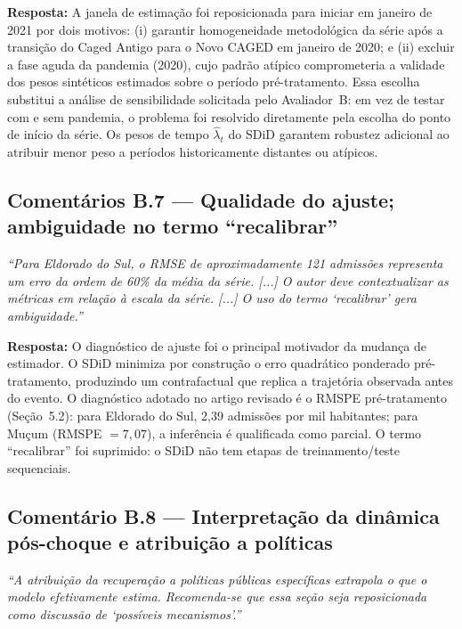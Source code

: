 \documentclass[a4paper,12pt]{article}
\newcommand{\avB}[1]{\textcolor{corB}{\textit{#1}}}
\newcommand{\resposta}[1]{\noindent\textbf{Resposta:} #1}
\begin{document}
\bigskip

\resposta{A janela de estimação foi reposicionada para iniciar em janeiro de 2021 por
dois motivos: (i) garantir homogeneidade metodológica da série após a transição do
Caged Antigo para o Novo CAGED em janeiro de 2020; e (ii) excluir a fase aguda da
pandemia (2020), cujo padrão atípico comprometeria a validade dos pesos sintéticos
estimados sobre o período pré-tratamento. Essa escolha substitui a análise de
sensibilidade solicitada pelo Avaliador~B: em vez de testar com e sem pandemia, o
problema foi resolvido diretamente pela escolha do ponto de início da série. Os pesos
de tempo $\hat{\lambda}_t$ do SDiD garantem robustez adicional ao atribuir menor peso
a períodos historicamente distantes ou atípicos.}

\bigskip

\subsection*{Comentários B.7 — Qualidade do ajuste; ambiguidade no termo ``recalibrar''}

\avB{``Para Eldorado do Sul, o RMSE de aproximadamente 121 admissões representa um
erro da ordem de 60\% da média da série. [...] O autor deve contextualizar as métricas
em relação à escala da série. [...] O uso do termo `recalibrar' gera ambiguidade.''}

\bigskip

\resposta{O diagnóstico de ajuste foi o principal motivador da mudança de estimador. O
SDiD minimiza por construção o erro quadrático ponderado pré-tratamento, produzindo um
contrafactual que replica a trajetória observada antes do evento. O diagnóstico adotado
no artigo revisado é o RMSPE pré-tratamento (Seção~5.2): para Eldorado do Sul, 2,39
admissões por mil habitantes; para Muçum (RMSPE $= 7{,}07$), a inferência é qualificada
como parcial. O termo ``recalibrar'' foi suprimido: o SDiD não tem etapas de
treinamento/teste sequenciais.}

\bigskip

\subsection*{Comentário B.8 — Interpretação da dinâmica pós-choque e atribuição a
políticas}

\avB{``A atribuição da recuperação a políticas públicas específicas extrapola o que o
modelo efetivamente estima. Recomenda-se que essa seção seja reposicionada como
discussão de `possíveis mecanismos'.''}
\end{document}
